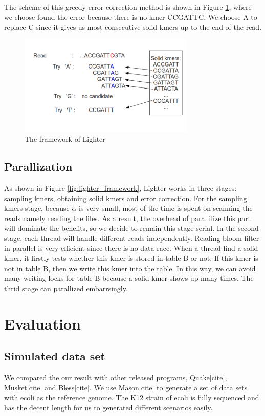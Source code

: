 \documentclass[10pt]{article}
\begin{document}
The scheme of this greedy error correction method is shown in Figure \ref{fig:error_correction}, where we choose found the error because there is no kmer CCGATTC. We choose A to replace C since it gives us most consecutive solid kmers up to the end of the read.

\begin{figure}[h!]
\begin{center}
\includegraphics[width=0.75\textwidth]{ErrorCorrection.png}
\caption{The framework of Lighter\label{fig:error_correction}}
\end{center}
\end{figure}

\subsection*{Parallization}
As shown in Figure \ref{fig:lighter_framework}, Lighter works in three stages: sampling kmers, obtaining solid kmers and error correction. For the sampling kmers stage, because $\alpha$ is very small, most of the time is spent on scanning the reads namely reading the files. As a result, the overhead of parallilize this part will dominate the benefits, so we decide to remain this stage serial. In the second stage, each thread will handle different reads independently. Reading bloom filter in parallel is very efficient since there is no data race. When a thread find a solid kmer, it firstly tests whether this kmer is stored in table B or not. If this kmer is not in table B, then we write this kmer into the table. In this way, we can avoid many writing locks for table B because a solid kmer shows up many times. The thrid stage can parallized embarrsingly.

\section*{Evaluation}
\subsection*{Simulated data set}
We compared the our result with other released programs, Quake[cite], Musket[cite] and Bless[cite]. We use Mason[cite] to generate a set of data sets with ecoli as the reference genome. The K12 strain of ecoli is fully sequenced and has the decent length for us to generated different scenarios easily. 
\end{document}
